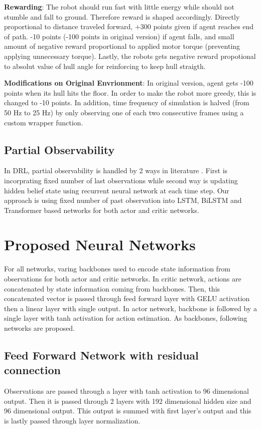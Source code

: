 \textbf{Rewarding}: The robot should run fast with little energy while should not stumble and fall to ground. Therefore reward is shaped accordingly. Directly proportional to distance traveled forward, +300 points given if agent reaches end of path. -10 points (-100 points in original version)  if agent falls, and small amount of negative reward proportional to applied motor torque (preventing applying unnecessary torque). Lastly, the robots gets negative reward propotional to absolut value of hull angle for reinforcing to keep hull straigth. 

\textbf{Modifications on Original Envrionment}: In original version, agent gets -100 points when its hull hits the floor. In order to make the robot more greedy, this is changed to -10 points. In addition, time frequency of simulation is halved (from 50 Hz to 25 Hz) by only observing one of each two consecutive frames using a custom wrapper function. 

\subsection{Partial Observability}
In DRL, partial observability is handled by 2 ways in literature \cite{dulac-arnold_challenges_2019}. First is incorprating fixed number of last observations while second way is updating hidden belief state using recurrent neural network at each time step. Our approach is using fixed number of past observation into LSTM, BiLSTM and Transformer based networks for both actor and critic networks. 

\section{Proposed Neural Networks}

For all networks, varing backbones used to encode state information from observations for both actor and critic networks. In critic network, actions are concatenated by state information coming from backbones. Then, this concatenated vector is passed through feed forward layer with GELU activation then a linear layer with single output. In actor network, backbone is followed by a single layer with tanh activation for action estimation. As backbones, following networks are proposed.

\subsection{Feed Forward Network with residual connection}
Observations are passed through a layer with tanh activation to 96 dimensional output. Then it is passed through 2 layers with 192 dimensional hidden size and 96 dimensional output. This output is summed with first layer's output and this is lastly passed through layer normalization.


